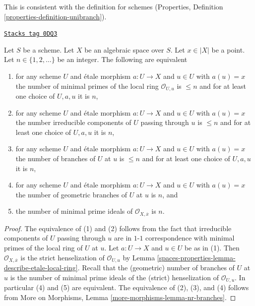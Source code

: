 This is consistent with the definition for schemes
(Properties, Definition \ref{properties-definition-unibranch}).

\begin{lemma}
\label{spaces-properties-lemma-nr-branches-local-ring}
\href{https://stacks.math.columbia.edu/tag/0DQ3}{\texttt{Stacks tag 0DQ3}}

Let $S$ be a scheme. Let $X$ be an algebraic space over $S$.
Let $x \in |X|$ be a point. Let $n \in \{1, 2, \ldots\}$ be an integer.
The following are equivalent
\begin{enumerate}
\item for any scheme $U$ and \'etale morphism $a : U \to X$ and
$u \in U$ with $a(u) = x$ the number of minimal primes
of the local ring $\mathcal{O}_{U, u}$ is $\leq n$
and for at least one choice of $U, a, u$ it is $n$,
\item for any scheme $U$ and \'etale morphism $a : U \to X$ and
$u \in U$ with $a(u) = x$ the number irreducible components of
$U$ passing through $u$ is $\leq n$ and for at least one choice
of $U, a, u$ it is $n$,
\item for any scheme $U$ and \'etale morphism $a : U \to X$ and $u \in U$
with $a(u) = x$ the number of branches of $U$ at $u$ is $\leq n$
and for at least one choice of $U, a, u$ it is $n$,
\item for any scheme $U$ and \'etale morphism $a : U \to X$ and $u \in U$
with $a(u) = x$ the number of geometric branches of $U$ at $u$ is $n$, and
\item the number of minimal prime ideals of
$\mathcal{O}_{X, \overline{x}}$ is $n$.
\end{enumerate}
\end{lemma}

\begin{proof}
The equivalence of (1) and (2) follows from the fact that irreducible
components of $U$ passing through $u$ are in $1$-$1$ correspondence with
minimal primes of the local ring of $U$ at $u$. Let $a : U \to X$ and
$u \in U$ be as in (1). Then $\mathcal{O}_{X, \overline{x}}$ is the
strict henselization of $\mathcal{O}_{U, u}$ by
Lemma \ref{spaces-properties-lemma-describe-etale-local-ring}. Recall that
the (geometric) number of branches of $U$ at $u$ is the number
of minimal prime ideals of the (strict) henselization of $\mathcal{O}_{U, u}$.
In particular (4) and (5) are equivalent.
The equivalence of (2), (3), and (4) follows from
More on Morphisms, Lemma \ref{more-morphisms-lemma-nr-branches}.
\end{proof}

